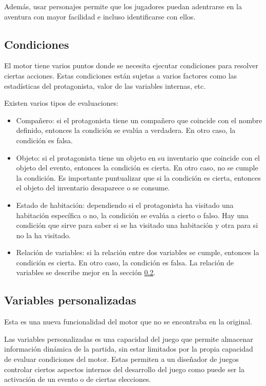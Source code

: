Además, usar personajes permite que los jugadores puedan adentrarse en la aventura con mayor facilidad e incluso identificarse con ellos.

\subsection{Condiciones} \label{conditionsSubsection}
El motor tiene varios puntos donde se necesita ejecutar condiciones para resolver ciertas acciones. Estas condiciones están sujetas a varios factores como las estadísticas del protagonista, valor de las variables internas, etc.

Existen varios tipos de evaluaciones:
\begin{itemize}
	\item Compañero: si el protagonista tiene un compañero que coincide con el nombre definido, entonces la condición se evalúa a verdadera. En otro caso, la condición es falsa.
	\item Objeto: si el protagonista tiene un objeto en su inventario que coincide con el objeto del evento, entonces la condición es cierta. En otro caso, no se cumple la condición. Es importante puntualizar que si la condición es cierta, entonces el objeto del inventario desaparece o se consume.
	\item Estado de habitación: dependiendo si el protagonista ha visitado una habitación específica o no, la condición se evalúa a cierto o falso. Hay una condición que sirve para saber si se ha visitado una habitación y otra para si no la ha visitado.
	\item Relación de variables: si la relación entre dos variables se cumple, entonces la condición es cierta. En otro caso, la condición es falsa. La relación de variables se describe mejor en la sección \ref{variablesSection}.
\end{itemize}

\subsection{Variables personalizadas} \label{variablesSection}
Esta es una nueva funcionalidad del motor que no se encontraba en la original.

Las variables personalizadas es una capacidad del juego que permite almacenar información dinámica de la partida, sin estar limitados por la propia capacidad de evaluar condiciones del motor. Estas permiten a un diseñador de juegos controlar ciertos aspectos internos del desarrollo del juego como puede ser la activación de un evento o de ciertas elecciones.


